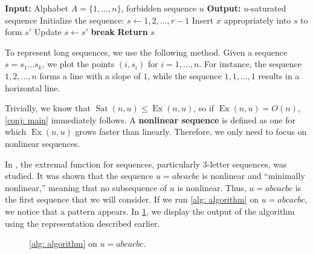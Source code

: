 \documentclass[12pt]{amsart}
\DeclareMathOperator{\Sat}{Sat}
\DeclareMathOperator{\Ex}{Ex}
\theoremstyle{definition}
\numberwithin{equation}{section}
\numberwithin{table}{thm}
\begin{document}
\begin{algorithm}
\begin{algorithmic}[1]
\State \textbf{Input:} Alphabet $A = \{1, \dots, n\}$, forbidden sequence $u$
\State \textbf{Output:} $u$-saturated sequence
\State Initialize the sequence: $s \gets 1, 2, \dots, r-1$ 
            \State Insert $x$ appropriately into $s$ to form $s'$ 
            \State Update $s \gets s'$ 
            \State \textbf{break} 
        \EndIf
    \EndFor
\EndWhile
\State \textbf{Return} $s$ 
\end{algorithmic}
\caption{Constructing a $u$-Saturated Sequence}\label{alg: algorithm}
\end{algorithm}



To represent long sequences, we use the following method. Given a sequence $s = s_1 \dots s_k$, we plot the points $(i, s_i)$ for $i = 1, \dots, n$. For instance, the sequence $1, 2, \dots, n$ forms a line with a slope of $1$, while the sequence $1, 1, \dots, 1$ results in a horizontal line. 

Trivially, we know that $ \Sat(n,u) \leq \Ex(n,u) $, so if $ \Ex(n,u) = O(n) $, \cref{conj: main} immediately follows. A \textbf{nonlinear sequence} is defined as one for which $ \Ex(n,u) $ grows faster than linearly. Therefore, we only need to focus on nonlinear sequences.

In \cite{PETTIE20111863}, the extremal function for sequences, particularly $3$-letter sequences, was studied. It was shown that the sequence $ u = abcacbc $ is nonlinear and ``minimally nonlinear,'' meaning that no subsequence of $ u $ is nonlinear. Thus, $u=abcacbc$ is the first sequence that we will consider. If we run \cref{alg: algorithm} on $u=abcacbc$, we notice that a pattern appears. In \cref{fig: abcacbc}, we display the output of the algorithm using the representation described earlier.

\begin{figure}[ht]
\centering
{}
\caption{\cref{alg: algorithm} on $u=abcacbc$.}\label{fig: abcacbc}
\end{figure}
\end{document}
